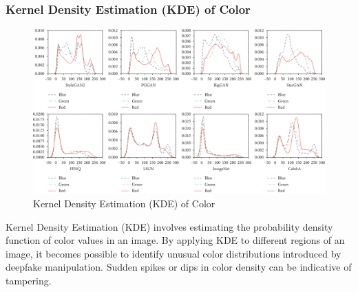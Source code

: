 \subsubsection{Kernel Density Estimation (KDE) of Color}


\begin{figure}[htbp]
    \centering
    \includegraphics[width=5in]{img/KDE.png}
    \caption{{Kernel Density Estimation (KDE) of Color}}
\end{figure}
Kernel Density Estimation (KDE) involves estimating the probability density function of color values in an image. By applying KDE to different regions of an image, it becomes possible to identify unusual color distributions introduced by deepfake manipulation. Sudden spikes or dips in color density can be indicative of tampering.
